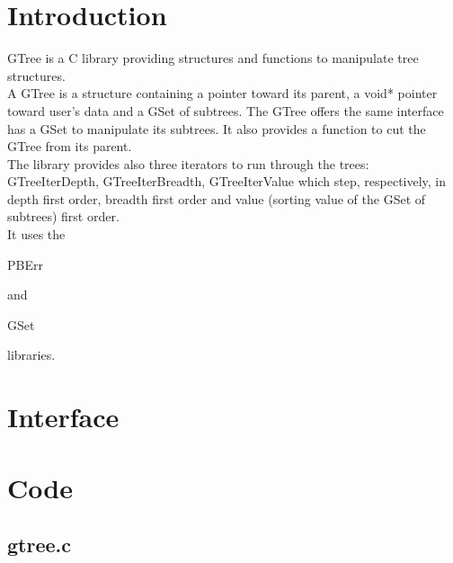 \section*{Introduction}

GTree is a C library providing structures and functions to manipulate tree structures.\\ 

A GTree is a structure containing a pointer toward its parent, a void* pointer toward user's data and a GSet of subtrees. The GTree offers the same interface has a GSet to manipulate its subtrees. It also provides a function to cut the GTree from its parent.\\

The library provides also three iterators to run through the trees: GTreeIterDepth, GTreeIterBreadth, GTreeIterValue which step, respectively, in depth first order, breadth first order and value (sorting value of the GSet of subtrees) first order.\\

It uses the \begin{ttfamily}PBErr\end{ttfamily} and \begin{ttfamily}GSet\end{ttfamily} libraries.\\

\section{Interface}

\begin{scriptsize}
\begin{ttfamily}

\end{ttfamily}
\end{scriptsize}

\section{Code}

\subsection{gtree.c}

\begin{scriptsize}
\begin{ttfamily}

\end{ttfamily}
\end{scriptsize}

